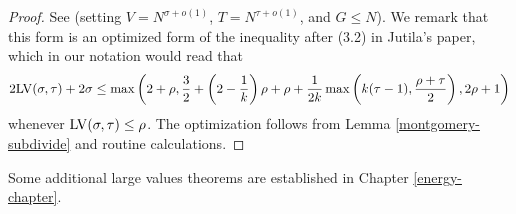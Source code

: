 \literature
{}

\begin{proof} See \cite[(1.4)]{jutila_zero_density_1977} (setting $V = N^{\sigma+o(1)}$, $T = N^{\tau+o(1)}$, and $G \leq N$).  We remark that this form is an optimized form of the inequality after (3.2) in Jutila's paper, which in our notation would read that
$$ 2\mathrm{LV}(\sigma,\tau) + 2\sigma \leq \max \left(2 + \rho, \frac{3}{2} + \left(2 - \frac{1}{k}\right)\rho + \rho + \frac{1}{2k}\max\left(k(\tau-1), \frac{\rho+\tau}{2}\right), 2\rho + 1\right)$$
whenever $\mathrm{LV}(\sigma,\tau) \leq \rho$.  The optimization follows from Lemma \ref{montgomery-subdivide} and routine calculations.
\end{proof}

Some additional large values theorems are established in Chapter \ref{energy-chapter}.
